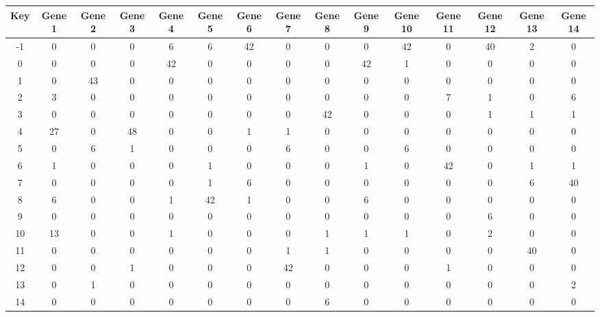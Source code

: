 \begin{tabular}{|c|c|c|c|c|c|c|c|c|c|c|c|c|c|c|}
\hline
Key & Gene 1 & Gene 2 & Gene 3 & Gene 4 & Gene 5 & Gene 6 & Gene 7 & Gene 8 & Gene 9 & Gene 10 & Gene 11 & Gene 12 & Gene 13 & Gene 14 \\
\hline
-1 & 0 & 0 & 0 & 6 & 6 & 42 & 0 & 0 & 0 & 42 & 0 & 40 & 2 & 0 \\
0 & 0 & 0 & 0 & 42 & 0 & 0 & 0 & 0 & 42 & 1 & 0 & 0 & 0 & 0 \\
1 & 0 & 43 & 0 & 0 & 0 & 0 & 0 & 0 & 0 & 0 & 0 & 0 & 0 & 0 \\
2 & 3 & 0 & 0 & 0 & 0 & 0 & 0 & 0 & 0 & 0 & 7 & 1 & 0 & 6 \\
3 & 0 & 0 & 0 & 0 & 0 & 0 & 0 & 42 & 0 & 0 & 0 & 1 & 1 & 1 \\
4 & 27 & 0 & 48 & 0 & 0 & 1 & 1 & 0 & 0 & 0 & 0 & 0 & 0 & 0 \\
5 & 0 & 6 & 1 & 0 & 0 & 0 & 6 & 0 & 0 & 6 & 0 & 0 & 0 & 0 \\
6 & 1 & 0 & 0 & 0 & 1 & 0 & 0 & 0 & 1 & 0 & 42 & 0 & 1 & 1 \\
7 & 0 & 0 & 0 & 0 & 1 & 6 & 0 & 0 & 0 & 0 & 0 & 0 & 6 & 40 \\
8 & 6 & 0 & 0 & 1 & 42 & 1 & 0 & 0 & 6 & 0 & 0 & 0 & 0 & 0 \\
9 & 0 & 0 & 0 & 0 & 0 & 0 & 0 & 0 & 0 & 0 & 0 & 6 & 0 & 0 \\
10 & 13 & 0 & 0 & 1 & 0 & 0 & 0 & 1 & 1 & 1 & 0 & 2 & 0 & 0 \\
11 & 0 & 0 & 0 & 0 & 0 & 0 & 1 & 1 & 0 & 0 & 0 & 0 & 40 & 0 \\
12 & 0 & 0 & 1 & 0 & 0 & 0 & 42 & 0 & 0 & 0 & 1 & 0 & 0 & 0 \\
13 & 0 & 1 & 0 & 0 & 0 & 0 & 0 & 0 & 0 & 0 & 0 & 0 & 0 & 2 \\
14 & 0 & 0 & 0 & 0 & 0 & 0 & 0 & 6 & 0 & 0 & 0 & 0 & 0 & 0 \\
\hline
\end{tabular}